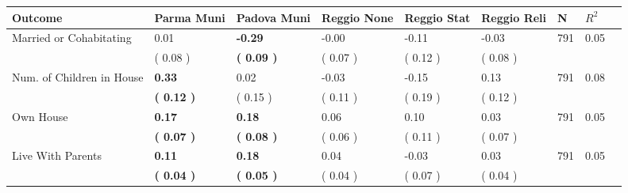 \begin{tabular}{L{6.2cm} C{1.8cm} C{1.8cm} C{1.8cm} C{1.8cm} C{1.8cm} C{1.8cm} C{0.3cm} C{0.3cm}}
\toprule
 \textbf{Outcome} & \textbf{Parma Muni} & \textbf{Padova Muni} & \textbf{Reggio None} & \textbf{Reggio Stat} & \textbf{Reggio Reli} & \textbf{N} & \textbf{$ R^2$} \\
\midrule
Married or Cohabitating &      0.01 & \textbf{    -0.29} &     -0.00 &     -0.11 &     -0.03  & 791 &       0.05 \\ 
 & (     0.08 ) & \textbf{(     0.09 )} & (     0.07 ) & (     0.12 ) & (     0.08 )  & \\
Num. of Children in House & \textbf{     0.33} &      0.02 &     -0.03 &     -0.15 &      0.13  & 791 &       0.08 \\ 
 & \textbf{(     0.12 )} & (     0.15 ) & (     0.11 ) & (     0.19 ) & (     0.12 )  & \\
Own House & \textbf{     0.17} & \textbf{     0.18} &      0.06 &      0.10 &      0.03  & 791 &       0.05 \\ 
 & \textbf{(     0.07 )} & \textbf{(     0.08 )} & (     0.06 ) & (     0.11 ) & (     0.07 )  & \\
Live With Parents & \textbf{     0.11} & \textbf{     0.18} &      0.04 &     -0.03 &      0.03  & 791 &       0.05 \\ 
 & \textbf{(     0.04 )} & \textbf{(     0.05 )} & (     0.04 ) & (     0.07 ) & (     0.04 )  & \\
\bottomrule
\end{tabular}
